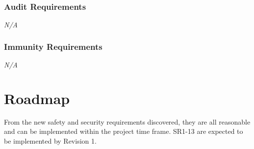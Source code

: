 \documentclass[12pt,letterpaper]{article}
\begin{document}
\subsubsection{Audit Requirements}
\noindent \emph{N/A}

\subsubsection{Immunity Requirements}
\noindent \emph{N/A}

\section{Roadmap}
From the new safety and security requirements discovered, they are all
reasonable and can be implemented within the project time frame. SR1-13 are
expected to be implemented by Revision 1.
\end{document}

